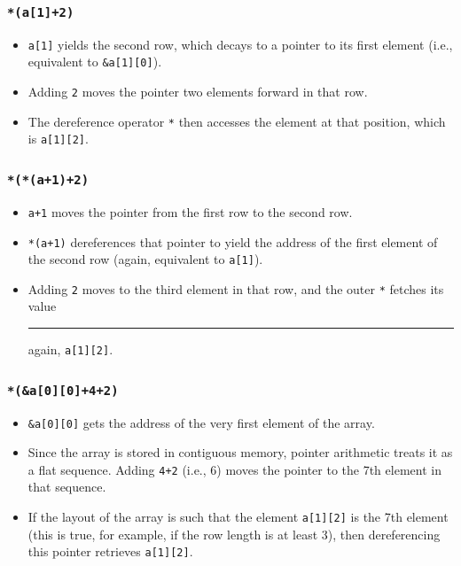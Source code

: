 \documentclass[a4paper, 10pt]{article}
\begin{document}
\subsubsection*{\texttt{*(a[1]+2)}}
\begin{itemize}
    \item \texttt{a[1]} yields the second row, which decays to a pointer to its first element (i.e., equivalent to \texttt{\&a[1][0]}).
    \item Adding \texttt{2} moves the pointer two elements forward in that row.
    \item The dereference operator \texttt{*} then accesses the element at that position, which is \texttt{a[1][2]}.
\end{itemize}

\subsubsection*{\texttt{*(*(a+1)+2)}}
\begin{itemize}
    \item \texttt{a+1} moves the pointer from the first row to the second row.
    \item \texttt{*(a+1)} dereferences that pointer to yield the address of the first element of the second row (again, equivalent to \texttt{a[1]}).
    \item Adding \texttt{2} moves to the third element in that row, and the outer \texttt{*} fetches its value \rule{\textwidth}{0.5pt}again, \texttt{a[1][2]}.
\end{itemize}

\subsubsection*{\texttt{*(\&a[0][0]+4+2)}}
\begin{itemize}
    \item \texttt{\&a[0][0]} gets the address of the very first element of the array.
    \item Since the array is stored in contiguous memory, pointer arithmetic treats it as a flat sequence. Adding \texttt{4+2} (i.e., 6) moves the pointer to the 7th element in that sequence.
    \item If the layout of the array is such that the element \texttt{a[1][2]} is the 7th element (this is true, for example, if the row length is at least 3), then dereferencing this pointer retrieves \texttt{a[1][2]}.
\end{itemize}
\end{document}
